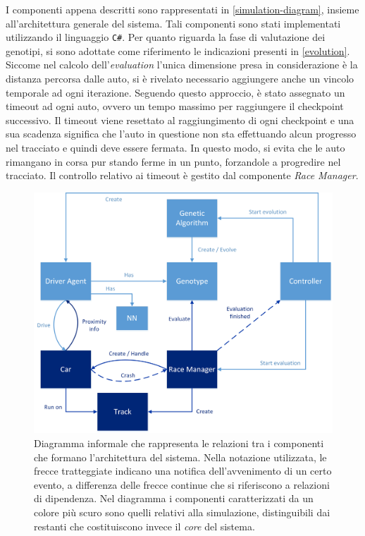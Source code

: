 \documentclass[a4paper,12pt]{article}
\begin{document}
I componenti appena descritti sono rappresentati in \autoref{simulation-diagram}, insieme all'architettura generale del sistema. Tali componenti sono stati implementati utilizzando il linguaggio \texttt{C\#}. Per quanto riguarda la fase di valutazione dei genotipi, si sono adottate come riferimento le indicazioni presenti in \autoref{evolution}. Siccome nel calcolo dell'\emph{evaluation} l'unica dimensione presa in considerazione è la distanza percorsa dalle auto, si è rivelato necessario aggiungere anche un vincolo temporale ad ogni iterazione. Seguendo questo approccio, è stato assegnato un timeout ad ogni auto, ovvero un tempo massimo per raggiungere il checkpoint successivo. Il timeout viene resettato al raggiungimento di ogni checkpoint e una sua scadenza significa che l'auto in questione non sta effettuando alcun progresso nel tracciato e quindi deve essere fermata. In questo modo, si evita che le auto rimangano in corsa pur stando ferme in un punto, forzandole a progredire nel tracciato. Il controllo relativo ai timeout è gestito dal componente \emph{Race Manager}.

\begin{figure}[H]
	\centering
	\includegraphics[width=130mm]{./img/architecture-simulation.png}
	\caption{Diagramma informale che rappresenta le relazioni tra i componenti che formano l'architettura del sistema. Nella notazione utilizzata, le frecce tratteggiate indicano una notifica dell'avvenimento di un certo evento, a differenza delle frecce continue che si riferiscono a relazioni di dipendenza. Nel diagramma i componenti caratterizzati da un colore più scuro sono quelli relativi alla simulazione, distinguibili dai restanti che costituiscono invece il \emph{core} del sistema.  \label{simulation-diagram}}
\end{figure}
\end{document}
